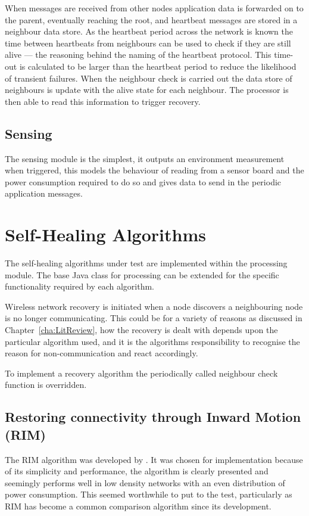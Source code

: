 \documentclass[authoryearcitations]{UoYCSproject}
\begin{document}
When messages are received from other nodes application data is forwarded on to the parent, eventually reaching the root, and heartbeat messages are stored in a neighbour data store. As the heartbeat period across the network is known the time between heartbeats from neighbours can be used to check if they are still alive --- the reasoning behind the naming of the heartbeat protocol. This time-out is calculated to be larger than the heartbeat period to reduce the likelihood of transient failures. When the neighbour check is carried out the data store of neighbours is update with the alive state for each neighbour. The processor is then able to read this information to trigger recovery.

\subsection{Sensing}

The sensing module is the simplest, it outputs an environment measurement when triggered, this models the behaviour of reading from a sensor board and the power consumption required to do so and gives data to send in the periodic application messages.

\section{Self-Healing Algorithms}

The self-healing algorithms under test are implemented within the processing module. The base Java class for processing can be extended for the specific functionality required by each algorithm.

Wireless network recovery is initiated when a node discovers a neighbouring node is no longer communicating. This could be for a variety of reasons as discussed in Chapter~\ref{cha:LitReview}, how the recovery is dealt with depends upon the particular algorithm used, and it is the algorithms responsibility to recognise the reason for non-communication and react accordingly.

To implement a recovery algorithm the periodically called neighbour check function is overridden.

\subsection{Restoring connectivity through Inward Motion (RIM)}

The RIM algorithm was developed by \citet*{Younis2010}. It was chosen for implementation because of its simplicity and performance, the algorithm is clearly presented and seemingly performs well in low density networks with an even distribution of power consumption. This seemed worthwhile to put to the test, particularly as RIM has become a common comparison algorithm since its development.
\end{document}
